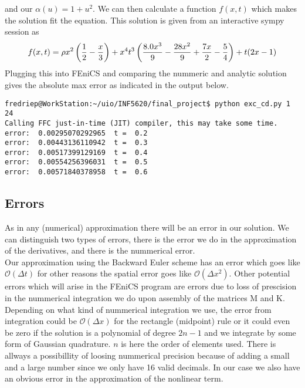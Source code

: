 \documentclass[a4paper,english, 10pt, twoside]{article}
\begin{document}
and our $\alpha(u) = 1+u^2$. We can then calculate a function $f(x,t)$ which makes the solution fit the equation. This solution is given from an 
interactive sympy session as 
\begin{equation}
 f(x,t) = \rho x^2\left({1\over2}-{x\over3}\right) +x^4t^3\left({8.0x^3\over9} -{28x^2\over9} +{7x\over2} -{5\over4}\right) +t(2x -1)
\end{equation}
Plugging this into FEniCS and comparing the nummeric and analytic solution gives the absolute max error as indicated in the output below.
\begin{lstlisting}
fredriep@WorkStation:~/uio/INF5620/final_project$ python exc_cd.py 1 24
Calling FFC just-in-time (JIT) compiler, this may take some time.
error:  0.00295070292965  t =  0.2
error:  0.00443136110942  t =  0.3
error:  0.00517399129169  t =  0.4
error:  0.00554256396031  t =  0.5
error:  0.00571840378958  t =  0.6
\end{lstlisting}


\subsection{Errors}
As in any (numerical) approximation there will be an error in our solution. We can distinguish two types of errors, there is the error we do in 
the approximation of the derivatives, and there is the nummerical error.\\
Our approximation using the Backward Euler scheme has an error which goes like $\mathcal{O}(\Delta t)$ for other reasons the spatial error goes 
like $\mathcal{O}(\Delta x^2)$. Other potential errors which will arise in the FEniCS program are errors due to loss of prescision in the 
nummerical integration we do upon assembly of the matrices M and K. Depending on what kind of nummerical integration we use, the error from integration 
could be $\mathcal{O}(\Delta x)$ for the rectangle (midpoint) rule or it could even be zero if the solution is a polynomial of degree $2n-1$ 
and we integrate by some form of Gaussian quadrature. $n$ is here the order of elements used.
There is allways a possibillity of loosing nummerical precision because of adding a small and a large number since we only have 16 valid decimals.
In our case we also have an obvious error in the approximation of the nonlinear term. 
\end{document}
